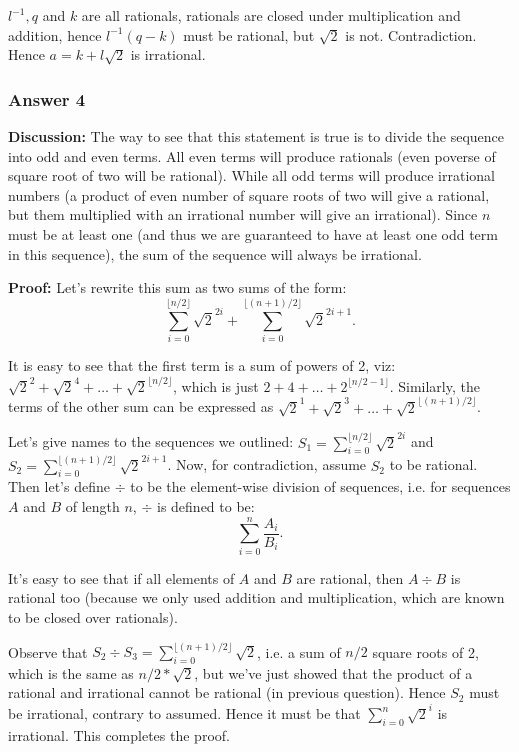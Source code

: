 \documentclass[11pt]{article}
\begin{document}
$l^{-1}, q$ and $k$ are all rationals, rationals are closed under multiplication
and addition, hence $l^{-1}(q-k)$ must be rational, but $\sqrt{2}$ is not.
Contradiction.  Hence $a=k+l\sqrt{2}$ is irrational.
\subsubsection{Answer 4}
\label{sec-1-2-2}
\textbf{Discussion:} The way to see that this statement is true is to divide the sequence
into odd and even terms.  All even terms will produce rationals (even poverse of
square root of two will be rational).  While all odd terms will produce irrational
numbers (a product of even number of square roots of two will give a rational, but
them multiplied with an irrational number will give an irrational).  Since $n$
must be at least one (and thus we are guaranteed to have at least one odd term in
this sequence), the sum of the sequence will always be irrational.

\textbf{Proof:} Let's rewrite this sum as two sums of the form:
\begin{equation*}
  \sum_{i=0}^{\lfloor n/2 \rfloor} \sqrt{2}^{2i} +
  \sum_{i=0}^{\lfloor (n+1)/2 \rfloor} \sqrt{2}^{2i+1}.
\end{equation*}

It is easy to see that the first term is a sum of powers of 2, viz:
$\sqrt{2}^2+\sqrt{2}^4+\hdots+\sqrt{2}^{\lfloor n/2 \rfloor}$, which is just
$2+4+\hdots+2^{\lfloor n/2-1 \rfloor}$.  Similarly, the terms of the other
sum can be expressed as $\sqrt{2}^1+\sqrt{2}^3+\hdots+\sqrt{2}^{\lfloor
    (n+1)/2 \rfloor}$.

Let's give names to the sequences we outlined: $S_1=\sum_{i=0}^{\lfloor n/2
    \rfloor} \sqrt{2}^{2i}$ and $S_2=\sum_{i=0}^{\lfloor (n+1)/2 \rfloor}
    \sqrt{2}^{2i+1}$.  Now, for contradiction, assume $S_2$ to be rational.
Then let's define $\div$ to be the element-wise division of sequences,
i.e. for sequences $A$ and $B$ of length $n$, $\div$ is defined to be:
\begin{equation*}
  \sum_{i=0}^n \frac{A_i}{B_i}.
\end{equation*}

It's easy to see that if all elements of $A$ and $B$ are rational, then $A
    \div B$ is rational too (because we only used addition and multiplication,
which are known to be closed over rationals).

Observe that $S_2 \div S_3=\sum_{i=0}^{\lfloor (n+1)/2 \rfloor} \sqrt{2}$,
i.e. a sum of $n/2$ square roots of 2, which is the same as $n/2*\sqrt{2}$,
but we've just showed that the product of a rational and irrational cannot be
rational (in previous question). Hence $S_2$ must be irrational, contrary to
assumed.  Hence it must be that $\sum_{i=0}^n \sqrt{2}^i$ is irrational.
This completes the proof.
\end{document}
